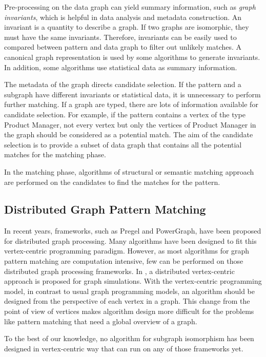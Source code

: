 Pre-processing on the data graph can yield summary information, such as \textit{graph invariants}, which is helpful in data analysis and metadata construction. An invariant is a quantity to describe a graph. If two graphs are isomorphic, they must have the same invariants. Therefore, invariants can be easily used to compared between pattern and data graph to filter out unlikely matches. A canonical graph representation is used by some algorithms to generate invariants\cite{washio2003state}. In addition, some algorithms use statistical data as summary information\cite{getoor2011learning}.

The metadata of the graph directs candidate selection. If the pattern and a subgraph have different invariants or statistical data, it is unnecessary to perform further matching. If a graph are typed, there are lots of information available for candidate selection. For example, if the pattern contains a vertex of the type Product Manager, not every vertex but only the vertices of Product Manager in the graph should be considered as a potential match. The aim of the candidate selection is to provide a subset of data graph that contains all the potential matches for the matching phase.

In the matching phase, algorithms of structural or semantic matching approach are performed on the candidates to find the matches for the pattern.

\subsection{Distributed Graph Pattern Matching}

In recent years, frameworks, such as Pregel and PowerGraph, have been proposed for distributed graph processing. Many algorithms have been designed to fit this vertex-centric programming paradigm. However, as most algorithms for graph pattern matching are computation intensive, few can be performed on those distributed graph processing frameworks. In \cite{fard2013distributed}, a distributed vertex-centric approach is proposed for graph simulations. With the vertex-centric programming model, in contrast to usual graph programming models, an algorithm should be designed from the perspective of each vertex in a graph. This change from the point of view of vertices makes algorithm design more difficult for the problems like pattern matching that need a global overview of a graph.

To the best of our knowledge, no algorithm for subgraph isomorphism has been designed in vertex-centric way that can run on any of those frameworks yet.

